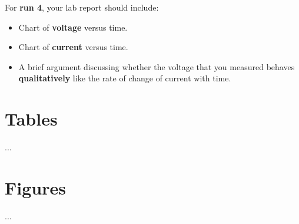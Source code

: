 For \textbf{run 4}, your lab report should include:
\begin{itemize}
	\item Chart of \textbf{voltage} versus time.
	\item Chart of \textbf{current} versus time.
	\item A brief argument discussing whether the voltage that you measured behaves \textbf{qualitatively} like the rate of change of current with time.
\end{itemize}
\newpage
\section{Tables}
...
\newpage
\section{Figures}
...
